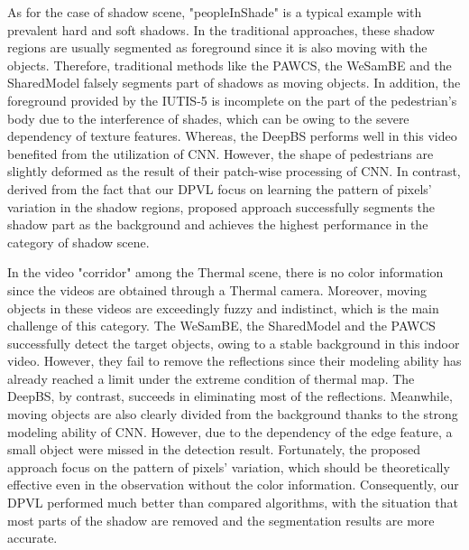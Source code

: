 \documentclass[journal]{IEEEtran}
\begin{document}
As for the case of shadow scene, "peopleInShade" is a typical example with prevalent hard and soft shadows. 
In the traditional approaches, these shadow regions are usually segmented as foreground since it is also moving with the objects. 
Therefore, traditional methods like the PAWCS, the WeSamBE and the SharedModel falsely segments part of shadows as moving objects. 
In addition, the foreground provided by the IUTIS-5 is incomplete on the part of the pedestrian's body due to the interference of shades, which can be owing to the severe dependency of texture features. 
Whereas, the DeepBS performs well in this video benefited from the utilization of CNN. 
However, the shape of pedestrians are slightly deformed as the result of their patch-wise processing of CNN. 
In contrast, derived from the fact that our DPVL focus on learning the pattern of pixels' variation in the shadow regions, proposed approach successfully segments the shadow part as the background and achieves the highest performance in the category of shadow scene.

In the video "corridor" among the Thermal scene, there is no color information since the videos are obtained through a Thermal camera. 
Moreover, moving objects in these videos are exceedingly fuzzy and indistinct, which is the main challenge of this category. 
The WeSamBE, the SharedModel and the PAWCS successfully detect the target objects, owing to a stable background in this indoor video. 
However, they fail to remove the reflections since their modeling ability has already reached a limit under the extreme condition of thermal map. 
The DeepBS, by contrast, succeeds in eliminating most of the reflections. 
Meanwhile, moving objects are also clearly divided from the background thanks to the strong modeling ability of CNN. 
However, due to the dependency of the edge feature, a small object were missed in the detection result. 
Fortunately, the proposed approach focus on the pattern of pixels' variation, which should be theoretically effective even in the observation without the color information. 
Consequently, our DPVL performed much better than compared algorithms, with the situation that most parts of the shadow are removed and the segmentation results are more accurate.
\end{document}
